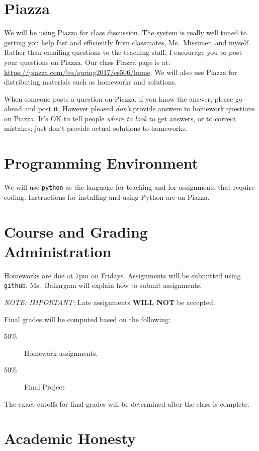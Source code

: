 \documentclass[11pt]{article}
\begin{document}
\section*{Piazza}

We will be using Piazza for class discussion. The system is really well
tuned to getting you help fast and efficiently from classmates, Ms.\ Missimer,
and myself. Rather than emailing questions to the teaching staff,
I encourage you to post your questions on Piazza.   Our class Piazza
page  is at: \url{https://piazza.com/bu/spring2017/cs506/home}. 
We will also use Piazza for distributing materials
such as homeworks and solutions.

When someone posts a question on Piazza, if you know the answer, please
go ahead and post it.   However pleased \emph{don't} provide answers to homework
questions on Piazza.   It's OK to tell people \emph{where to look} to
get answers, or to correct mistakes;  just don't provide actual solutions
to homeworks.

\section*{Programming Environment}

We will use \texttt{python} as the language for teaching and for
assignments that require coding.    Instructions for installing and
using Python are on Piazza.

\section*{Course and Grading Administration}

Homeworks are due at 7pm on Fridays.
Assignments will be submitted using \texttt{github}.   Ms.\ Bahargam will
explain how to submit assignments.  

\emph{NOTE: IMPORTANT:} Late assignments \textbf{WILL NOT} be accepted. 

Final grades will be computed based on the following:
\begin{description}
\item[50\%] Homework assignments.  
\item[50\%] Final Project
\end{description}

The exact cutoffs for final grades will be determined after the class is
complete.

\newpage

\section*{Academic Honesty}
\end{document}
